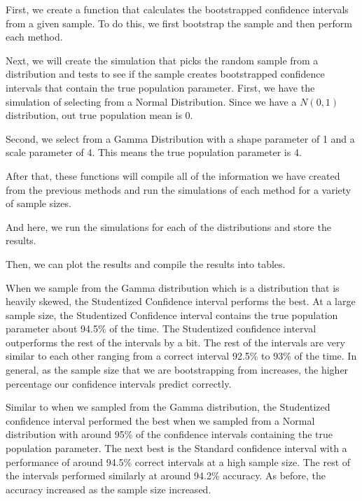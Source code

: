 \documentclass[12pt]{article}
\begin{document}
First, we create a function that calculates the bootstrapped confidence
intervals from a given sample. To do this, we first bootstrap the sample
and then perform each method.

Next, we will create the simulation that picks the random sample from a
distribution and tests to see if the sample creates bootstrapped
confidence intervals that contain the true population parameter. First,
we have the simulation of selecting from a Normal Distribution. Since we
have a \(N(0,1)\) distribution, out true population mean is 0.

Second, we select from a Gamma Distribution with a shape parameter of 1
and a scale parameter of 4. This means the true population parameter is
4.

After that, these functions will compile all of the information we have
created from the previous methods and run the simulations of each method
for a variety of sample sizes.

And here, we run the simulations for each of the distributions and store
the results.

Then, we can plot the results and compile the results into tables.

When we sample from the Gamma distribution which is a distribution that
is heavily skewed, the Studentized Confidence interval performs the
best. At a large sample size, the Studentized Confidence interval
contains the true population parameter about 94.5\% of the time. The
Studentized confidence interval outperforms the rest of the intervals by
a bit. The rest of the intervals are very similar to each other ranging
from a correct interval 92.5\% to 93\% of the time. In general, as the
sample size that we are bootstrapping from increases, the higher
percentage our confidence intervals predict correctly.

Similar to when we sampled from the Gamma distribution, the Studentized
confidence interval performed the best when we sampled from a Normal
distribution with around 95\% of the confidence intervals containing the
true population parameter. The next best is the Standard confidence
interval with a performance of around 94.5\% correct intervals at a high
sample size. The rest of the intervals performed similarly at around
94.2\% accuracy. As before, the accuracy increased as the sample size
increased.
\end{document}
